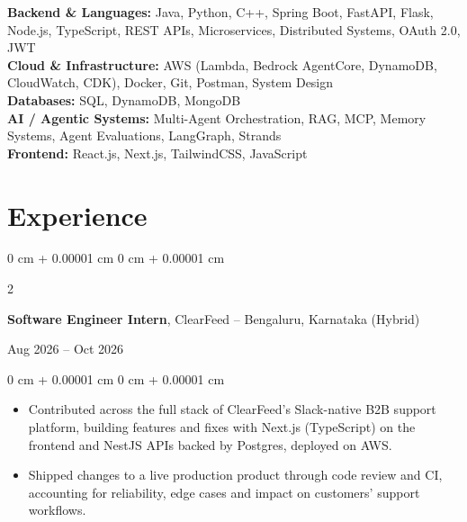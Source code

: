 \documentclass[10pt, letterpaper]{article}
\newenvironment{highlights}{
    \begin{itemize}[
        topsep=0.10 cm,
        parsep=0.10 cm,
        partopsep=0pt,
        itemsep=0pt,
        leftmargin=0 cm + 10pt
    ]
}{
    \end{itemize}
}
\newenvironment{onecolentry}{
    \begin{adjustwidth}{
        0 cm + 0.00001 cm
    }{
        0 cm + 0.00001 cm
    }
}{
    \end{adjustwidth}
}
\newenvironment{twocolentry}[2][]{
    \onecolentry
    \def\secondColumn{#2}
    \setcolumnwidth{\fill, 4.5 cm}
    \begin{paracol}{2}
}{
    \switchcolumn \raggedleft \secondColumn
    \end{paracol}
    \endonecolentry
}
\begin{document}
\textbf{Backend \& Languages:} Java, Python, C++, Spring Boot, FastAPI, Flask, Node.js, TypeScript, REST APIs, Microservices, Distributed Systems, OAuth 2.0, JWT \\

\textbf{Cloud \& Infrastructure:} AWS (Lambda, Bedrock AgentCore, DynamoDB, CloudWatch, CDK), Docker, Git, Postman, System Design \\

\textbf{Databases:} SQL, DynamoDB, MongoDB \\

\textbf{AI / Agentic Systems:} Multi-Agent Orchestration, RAG, MCP, Memory Systems, Agent Evaluations, LangGraph, Strands \\

\textbf{Frontend:} React.js, Next.js, TailwindCSS, JavaScript

    \section{Experience}
        \begin{twocolentry}{
            Aug 2026 -- Oct 2026
        }
            \textbf{Software Engineer Intern}, ClearFeed -- Bengaluru, Karnataka (Hybrid)
        \end{twocolentry}

        \vspace{0.10 cm}
        \begin{onecolentry}
            \begin{highlights}
\item Contributed across the full stack of ClearFeed's Slack-native B2B support platform, building features and fixes with Next.js (TypeScript) on the frontend and NestJS APIs backed by Postgres, deployed on AWS.
\item Shipped changes to a live production product through code review and CI, accounting for reliability, edge cases and impact on customers' support workflows.
            \end{highlights}
        \end{onecolentry}
\end{document}
